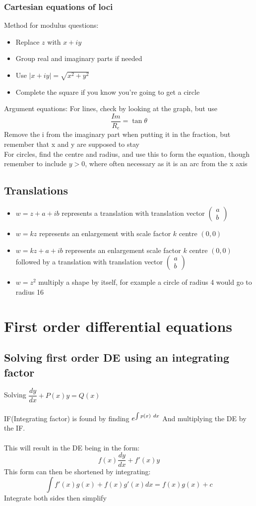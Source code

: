 \documentclass{article}[18pt]
\begin{document}
\subsubsection{Cartesian equations of loci}
Method for modulus questions:
\begin{itemize}
\item Replace $z$ with $x+iy$
\item Group real and imaginary parts if needed
\item Use $|x+iy|=\sqrt{x^2+y^2}$
\item Complete the square if you know you're going to get a circle
\end{itemize}
Argument equations:
For lines, check by looking at the graph, but use
$$\frac{Im}{R_e}=\tan\theta$$
Remove the i from the imaginary part when putting it in the fraction, but remember that x and y are supposed to stay\\
For circles, find the centre and radius, and use this to form the equation, though remember to include $y>0$, where often necessary as it is an arc from the x axis
\subsection{Translations}
\begin{itemize}
\item $w=z+a+ib$ represents a translation with translation vector $\begin{pmatrix}
a\\b
\end{pmatrix}$
\item $w=kz$ represents an enlargement with scale factor $k$ centre $(0,0)$
\item $w=kz+a+ib$ represents an enlargement scale factor $k$ centre $(0,0)$ followed by a translation with translation vector $\begin{pmatrix}
a\\b
\end{pmatrix}$
\item $w=z^2$ multiply a shape by itself, for example a circle of radius 4 would go to radius 16
\end{itemize}

\section{First order differential equations}
\subsection{Solving first order DE using an integrating factor}
Solving $\dfrac{dy}{dx}+P(x)y=Q(x)$\\
\\
IF(Integrating factor) is found by finding $\mathlarger{e^{\int p(x) \ dx}}$ And multiplying the DE by the IF.\\
\\
This will result in the DE being in the form:
$$f(x)\frac{dy}{dx}+f'(x)y$$
This form can then be shortened by integrating:
$$\int f'(x)g(x)+f(x)g'(x) dx=f(x)g(x)+c$$
Integrate both sides then simplify
\end{document}

